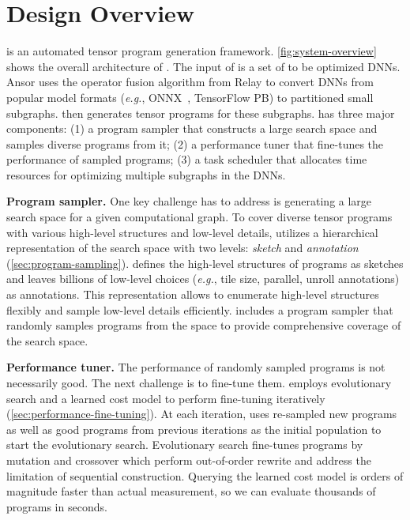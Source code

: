 \section{Design Overview}
\label{sec:overview}

\Ansor is an automated tensor program generation framework.
\autoref{fig:system-overview} shows the overall architecture of \Ansor. The input of \Ansor is a set of to be optimized DNNs.
Ansor uses the operator fusion algorithm from Relay\cite{roesch2019relay} to convert DNNs from popular model formats (\textit{e.g.}, ONNX~\cite{bai2019onnx}, TensorFlow PB) to partitioned small subgraphs.
\Ansor then generates tensor programs for these subgraphs.
\Ansor has three major components: (1) a program sampler that constructs a large search space and samples diverse programs from it; (2) a performance tuner that fine-tunes the performance of sampled programs; (3) a task scheduler that allocates time resources for optimizing multiple subgraphs in the DNNs.

\textbf{Program sampler.} One key challenge \Ansor has to address is generating a large search space for a given computational graph.
To cover diverse tensor programs with various high-level structures and low-level details, \Ansor utilizes a hierarchical representation of the search space with two levels: \textit{sketch} and \textit{annotation}   (\autoref{sec:program-sampling}). 
\Ansor defines the high-level structures of programs as sketches and leaves billions of low-level choices (\textit{e.g.}, tile size, parallel, unroll annotations) as annotations.
This representation allows \Ansor to enumerate high-level structures flexibly and sample low-level details efficiently.
\Ansor includes a program sampler that randomly samples programs from the space to provide comprehensive coverage of the search space. 

\textbf{Performance tuner.} The performance of randomly sampled programs is not necessarily good. The next challenge is to fine-tune them.
\Ansor employs evolutionary search and a learned cost model to perform fine-tuning iteratively (\autoref{sec:performance-fine-tuning}).
At each iteration, \Ansor uses re-sampled new programs as well as good programs from previous iterations as the initial population to start the evolutionary search.
Evolutionary search fine-tunes programs by mutation and crossover which perform out-of-order rewrite and address the limitation of sequential construction.
Querying the learned cost model is orders of magnitude faster than actual measurement, so we can evaluate thousands of programs in seconds.

